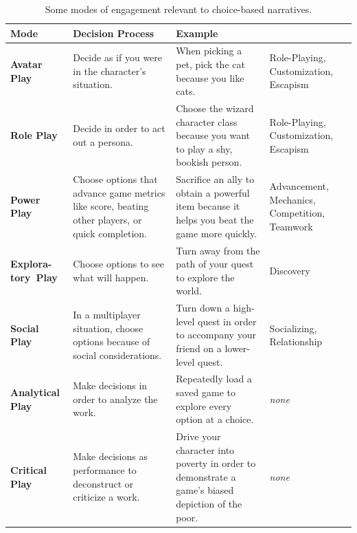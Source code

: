 \begin{table}[!p]
\begingroup
\renewcommand*{\arraystretch}{1.5}
\begin{tabular}{>{\raggedright}p{5.5em}>{\raggedright}p{10em}>{\raggedright}p{9.8em}>{\raggedright}p{6.6em}}
\toprule
\textbf{Mode} & \textbf{Decision Process} & \textbf{Example} & \textbf{\citep{Yee2006}} \tabularnewline
\midrule
\textbf{Avatar Play}%
& Decide as if you were in the character's situation.%
& When picking a pet, pick the cat because you like cats.%
& Role-Playing, Customization, Escapism \tabularnewline
\textbf{Role Play}
& Decide in order to act out a persona.
& Choose the wizard character class because you want to play a shy, bookish person.
& Role-Playing, Customization, Escapism \tabularnewline
\textbf{Power Play}
& Choose options that advance game metrics like score, beating other players, or quick completion.
& Sacrifice an ally to obtain a powerful item because it helps you beat the game more quickly.
& Advancement, Mechanics, Competition, Teamwork \tabularnewline
\textbf{Explora-tory~Play}
& Choose options to see what will happen.
& Turn away from the path of your quest to explore the world.
& Discovery \tabularnewline
\textbf{Social Play}
& In a multiplayer situation, choose options because of social considerations.
& Turn down a high-level quest in order to accompany your friend on a lower-level quest.
& Socializing, \newline Relationship \tabularnewline
\textbf{Analytical Play}
& Make decisions in order to analyze the work.
& Repeatedly load a saved game to explore every option at a choice.
& \emph{none} \tabularnewline
\textbf{Critical Play}
& Make decisions as performance to deconstruct or criticize a work.
& Drive your character into poverty in order to demonstrate a game's biased depiction of the poor.
& \emph{none} \tabularnewline
\bottomrule
\end{tabular}
\endgroup
\caption[Modes of engagement]{Some modes of engagement relevant to choice-based narratives.}
\label{tab:modes-of-engagement}
\end{table}

